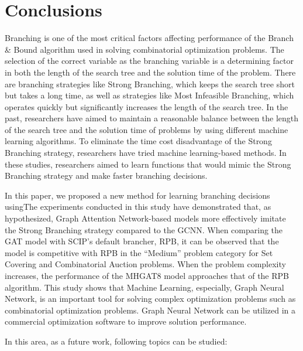 \section{Conclusions}\label{sec:conclusions}
Branching is one of the most critical factors affecting performance of the Branch \& Bound algorithm used in solving combinatorial optimization problems.
The selection of the correct variable as the branching variable is a determining factor in both the length of the search tree and the solution time of the problem.
There are branching strategies like Strong Branching, which keeps the search tree short but takes a long time, as well as strategies like Most Infeasible Branching, which operates quickly but significantly increases the length of the search tree.
In the past, researchers have aimed to maintain a reasonable balance between the length of the search tree and the solution time of problems by using different machine learning algorithms.
To eliminate the time cost disadvantage of the Strong Branching strategy, researchers have tried machine learning-based methods.
In these studies, researchers aimed to learn functions that would mimic the Strong Branching strategy and make faster branching decisions.


In this paper, we proposed a new method for learning branching decisions usingThe experiments conducted in this study have demonstrated that, as hypothesized, Graph Attention Network-based models more effectively imitate the Strong Branching strategy compared to the GCNN.
When comparing the GAT model with SCIP’s default brancher, RPB, it can be observed that the model is competitive with RPB in the “Medium” problem category for Set Covering and Combinatorial Auction problems.
When the problem complexity increases, the performance of the MHGAT8 model approaches that of the RPB algorithm.
This study shows that Machine Learning, especially, Graph Neural Network, is an important tool for solving complex optimization problems such as combinatorial optimization problems.
Graph Neural Network can be utilized in a commercial optimization software to improve solution performance.

In this area, as a future work, following topics can be studied:


